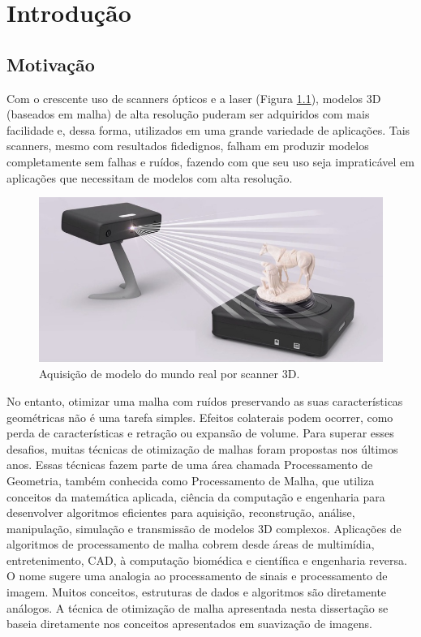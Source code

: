 \chapter{Introdução}
\label{cap:introducao}

\section{Motivação}
Com o crescente uso de scanners ópticos e a laser (Figura \ref{fig:scan3d}), modelos 3D (baseados em malha) de alta resolução puderam ser adquiridos com mais facilidade e, dessa forma, utilizados em uma grande variedade de aplicações. Tais scanners, mesmo com resultados fidedignos, falham em produzir modelos completamente sem falhas e ruídos, fazendo com que seu uso seja impraticável em aplicações que necessitam de modelos com alta resolução.
    
\begin{figure}[!ht]
\captionsetup{width=16cm}
\centering
\includegraphics[scale=0.6]{figuras/scan3d.jpg}
\caption{Aquisição de modelo do mundo real por scanner 3D.}
\label{fig:scan3d}
\end{figure}

No entanto, otimizar uma malha com ruídos preservando as suas características geométricas não é uma tarefa simples. Efeitos colaterais podem ocorrer, como perda de características e retração ou expansão de volume. Para superar esses desafios, muitas técnicas de otimização de malhas foram propostas nos últimos anos. Essas técnicas fazem parte de uma área chamada Processamento de Geometria, também conhecida como Processamento de Malha, que utiliza conceitos da matemática aplicada, ciência da computação e engenharia para desenvolver algoritmos eficientes para aquisição, reconstrução, análise, manipulação, simulação e transmissão de modelos 3D complexos. Aplicações de algoritmos de processamento de malha cobrem desde áreas de multimídia, entretenimento, CAD, à computação biomédica e científica e engenharia reversa. O nome sugere uma analogia ao processamento de sinais e processamento de imagem. Muitos conceitos, estruturas de dados e algoritmos são diretamente análogos. A técnica de otimização de malha apresentada nesta dissertação se baseia diretamente nos conceitos apresentados em suavização de imagens.

